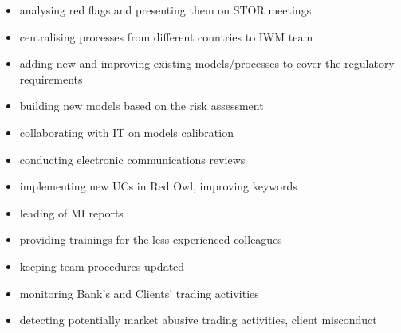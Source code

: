 
\begin{itemize}
	\item analysing red flags and presenting them on STOR meetings
	\item centralising processes from different countries to IWM team
	\item adding new and improving existing models/processes to cover the regulatory requirements
	\item building new models based on the risk assessment
	\item collaborating with IT on models calibration
	\item conducting electronic communications reviews
	\item implementing new UCs in Red Owl, improving keywords
	\item leading of MI reports
	\item providing trainings for the less experienced colleagues
	\item keeping team procedures updated
\end{itemize}

\divider

\begin{itemize}
	\item monitoring Bank’s and Clients' trading activities
	\item detecting potentially market abusive trading activities, client misconduct
\end{itemize}

\divider


\divider


\divider


